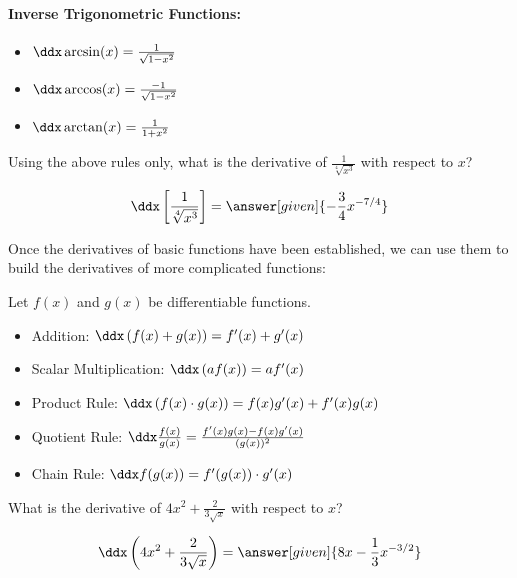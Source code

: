 \documentclass[nooutcomes]{ximera}
\begin{document}
\paragraph{Inverse Trigonometric Functions:}
\begin{itemize}
\item $\ddx \arcsin(x) = \frac{1}{\sqrt{1-x^2}}$
\item $\ddx \arccos(x) = \frac{-1}{\sqrt{1-x^2}}$
\item $\ddx \arctan(x) =\frac{1}{1+x^2}$
\end{itemize}



\begin{question} 
  Using the above rules only, what is the derivative of $\frac{1}{\sqrt[4]{x^3}}$ with respect to $x$?
  \begin{prompt} 
    \[
    \ddx \left[\frac{1}{\sqrt[4]{x^3}}\right] = \answer[given]{- \frac{3}{4} x^{-7/4}}
    \]
  \end{prompt}
\end{question}


Once the derivatives of basic functions have been established, we can use them to build the derivatives of more complicated functions:


\begin{theorem}
  Let $f(x)$ and $g(x)$ be differentiable functions.
\begin{itemize}
\item Addition: $\ddx \left( f(x) + g(x) \right) = f'(x) + g'(x)$
\item Scalar Multiplication: $\ddx \left( af(x) \right) = a f'(x)$
\item Product Rule: $\ddx \left( f(x) \cdot g(x) \right) = f(x)g'(x) + f'(x)g(x)$
\item Quotient Rule: $\ddx \frac{f(x)}{g(x)} = \frac{f'(x)g(x) - f(x)g'(x)}{(g(x))^2}$
\item Chain Rule: $\ddx f(g(x)) = f'(g(x)) \cdot g'(x)$
\end{itemize}
\end{theorem}

\begin{question} 
  What is the derivative of $4x^2 +\frac{2}{3\sqrt{x}} $ with respect to $x$?
  \begin{prompt} 
    \[
    \ddx \left(4x^2 +\frac{2}{3\sqrt{x}} \right) = \answer[given]{8x -\frac{1}{3} x^{-3/2}}
    \]
  \end{prompt}
\end{question}
\end{document}
